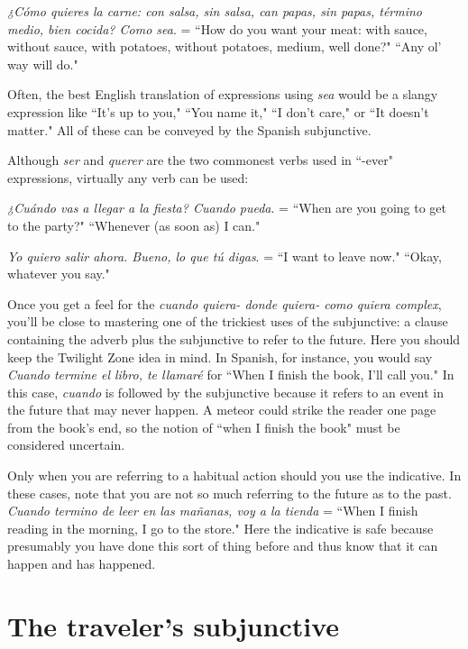 \indu \emph{¿Cómo quieres la carne: con salsa, sin salsa, can papas, sin
papas, término medio, bien cocida? Como sea}. =
``How do you want your meat: with sauce, without
sauce, with potatoes, without potatoes, medium, well
done?" ``Any ol' way will do."

\bsk

Often, the best English translation of expressions using \emph{sea}
would be a slangy expression like ``It's up to you," ``You name it," ``I
don't care," or ``It doesn't matter." All of these can be conveyed by the
Spanish subjunctive.

Although \emph{ser} and \emph{querer} are the two commonest verbs used in
``-ever" expressions, virtually any verb can be used:

\bsk

\indu \emph{¿Cuándo vas a llegar a la fiesta? Cuando pueda}. = ``When are
you going to get to the party?" ``Whenever (as soon as)
I can."

\indu \emph{Yo quiero salir ahora. Bueno, lo que tú digas}. = ``I want to
leave now." ``Okay, whatever you say."

\bsk

Once you get a feel for the \emph{cuando quiera- donde quiera- como quiera complex}, you'll be close to mastering one of the trickiest uses of the subjunctive: a clause containing the adverb plus the
subjunctive to refer to the future. Here you should keep the Twilight
Zone idea in mind. In Spanish, for instance, you would say \emph{Cuando
termine el libro, te llamaré} for ``When I finish the book, I'll call you."
In this case, \emph{cuando} is followed by the subjunctive because it refers to
an event in the future that may never happen. A meteor could strike
the reader one page from the book's end, so the notion of ``when I finish the book" must be considered uncertain.

Only when you are referring to a habitual action should you
use the indicative. In these cases, note that you are not so much referring to the future as to the past. \emph{Cuando termino de leer en las mañanas, voy a la tienda} = ``When I finish reading in the morning, I go
to the store." Here the indicative is safe because presumably you have
done this sort of thing before and thus know that it can happen and has
happened.

\section{The traveler's subjunctive}

